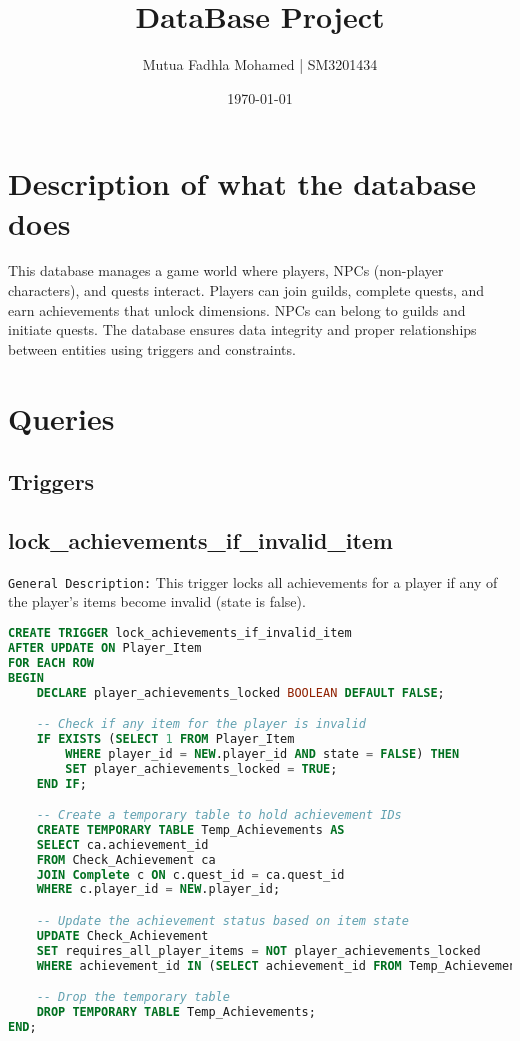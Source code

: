 \documentclass{article}
\title{DataBase Project}
\author{Mutua Fadhla Mohamed | SM3201434}
\date{\today}
\begin{document}
\maketitle

\section{Description of what the database does}

This database manages a game world where players, NPCs (non-player characters), and quests interact. 
Players can join guilds, complete quests, and earn achievements that unlock dimensions. 
NPCs can belong to guilds and initiate quests. The database ensures data integrity and proper relationships 
between entities using triggers and constraints.

\section{Queries}

\subsection{Triggers}

\subsection{lock\_achievements\_if\_invalid\_item}

\texttt{General Description:} This trigger locks all achievements for a player if any of the player's items
become invalid (state is false).

\begin{lstlisting}[language=SQL]
CREATE TRIGGER lock_achievements_if_invalid_item
AFTER UPDATE ON Player_Item
FOR EACH ROW
BEGIN
    DECLARE player_achievements_locked BOOLEAN DEFAULT FALSE;

    -- Check if any item for the player is invalid
    IF EXISTS (SELECT 1 FROM Player_Item
        WHERE player_id = NEW.player_id AND state = FALSE) THEN
        SET player_achievements_locked = TRUE;
    END IF;

    -- Create a temporary table to hold achievement IDs
    CREATE TEMPORARY TABLE Temp_Achievements AS
    SELECT ca.achievement_id
    FROM Check_Achievement ca
    JOIN Complete c ON c.quest_id = ca.quest_id
    WHERE c.player_id = NEW.player_id;

    -- Update the achievement status based on item state
    UPDATE Check_Achievement
    SET requires_all_player_items = NOT player_achievements_locked
    WHERE achievement_id IN (SELECT achievement_id FROM Temp_Achievements);

    -- Drop the temporary table
    DROP TEMPORARY TABLE Temp_Achievements;
END;
\end{lstlisting}
\end{document}
